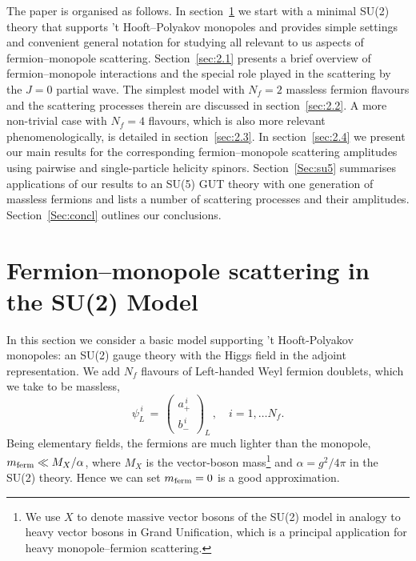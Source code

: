 \documentclass[a4paper,11pt]{article}
\begin{document}
The paper is organised as follows.
In section~\ref{Sec:su2} we start with a minimal SU(2) theory that supports 't Hooft--Polyakov monopoles and 
provides simple settings and convenient general notation for studying all relevant to us aspects of fermion--monopole scattering.
Section~\ref{sec:2.1} presents a brief overview of fermion--monopole interactions and the special role played in the scattering by the $J=0$ partial wave.
The simplest model with $N_f=2$ massless fermion flavours and the scattering processes therein are discussed in section~\ref{sec:2.2}.
A more non-trivial case with $N_f=4$ flavours, which is also more relevant phenomenologically, is detailed in section~\ref{sec:2.3}.
In section~\ref{sec:2.4} we present our main results for the corresponding fermion--monopole scattering amplitudes using pairwise and single-particle helicity spinors.
Section~\ref{Sec:su5} summarises applications of our results to an SU(5) GUT theory with one generation of massless fermions and lists 
a number of scattering processes and their amplitudes. Section~\ref{Sec:concl} outlines our conclusions.


\section{Fermion--monopole scattering in the SU(2) Model}
\label{Sec:su2}

In this section we consider a basic model supporting 't Hooft-Polyakov monopoles: an SU(2) gauge theory with the Higgs field in the adjoint representation. 
We add $N_f$ flavours of Left-handed Weyl fermion doublets, which we take to be massless, 
\begin{equation}
\label{eq:ferm_ab}
\psi_L^{\,i}\,=\, \begin{pmatrix}
a_{+}^{\,i} \\
b_{-}^{\,i}
\end{pmatrix}_L\,, \quad i=1,\ldots N_f.
\end{equation}
Being elementary fields, the fermions are much lighter than the monopole, $m_{\rm ferm} \ll M_X/ \alpha$, where $M_X$ is the vector-boson mass\footnote{We use $X$ to denote massive vector bosons of the SU(2) model in analogy to heavy vector bosons in Grand Unification, which is a principal application for heavy monopole--fermion scattering.}
 and $\alpha=g^2/4\pi$ in the SU(2) theory. Hence we can set $m_{\rm ferm} =0$ is a good approximation.
 
\end{document}
